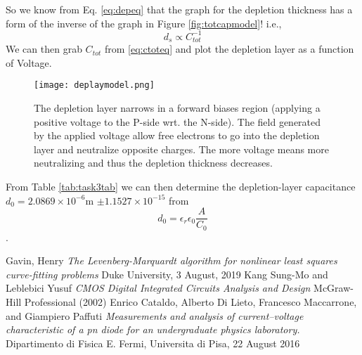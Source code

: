 \documentclass{article}
\begin{document}
So we know from Eq. \ref{eq:depeq} that the graph for the depletion thickness has a form of the inverse of the graph in Figure \ref{fig:totcapmodel}! i.e.,
\[d_s \propto C_{tot}^{-1}\]
We can then grab $C_{tot}$ from \ref{eq:ctoteq} and plot the depletion layer as a function of Voltage.
\begin{figure}
    \centering
    \texttt{[image: deplaymodel.png]}
    \caption{The depletion layer narrows in a forward biases region (applying a positive voltage to the P-side wrt. the N-side). The field generated by the applied voltage allow free electrons to go into the depletion layer and neutralize opposite charges. The more voltage means more neutralizing and thus the depletion thickness decreases. }
    \label{fig:deplaymodel}
\end{figure}
From Table \ref{tab:task3tab} we can then determine the depletion-layer capacitance $d_0=2.0869 \times 10^{-6}$m $\pm 1.1527 \times 10^{-15}$ from $$d_0= \epsilon_r \epsilon_0 \frac{A}{C_0}$$.

\begin{thebibliography}{9}

    Gavin, Henry
    \textit{The Levenberg-Marquardt algorithm for nonlinear least squares curve-fitting problems}
    Duke University, 3 August, 2019
    Kang Sung-Mo and Leblebici Yusuf
    \textit{CMOS Digital Integrated Circuits Analysis and Design}
    McGraw-Hill Professional (2002)
    Enrico Cataldo, Alberto Di Lieto, Francesco Maccarrone, and Giampiero Paffuti
    \textit{Measurements and analysis of current–voltage characteristic of a pn diode for an undergraduate physics laboratory.}
    Dipartimento di Fisica E. Fermi, Universita di Pisa, 22 August 2016

\end{thebibliography}
\end{document}
